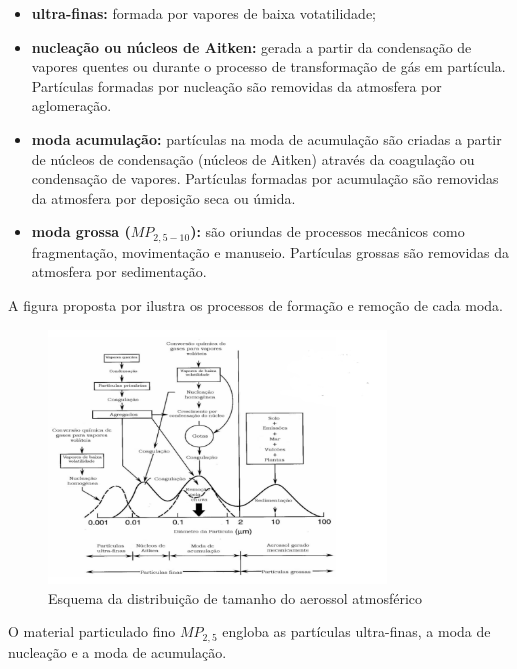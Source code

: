 \begin{itemize}
  \item \textbf{ultra-finas:} formada por vapores de baixa votatilidade;
  \item \textbf{nucleação ou núcleos de Aitken:} 
        gerada a partir da condensação de vapores quentes ou durante o processo de 
        transformação de gás em partícula. Partículas formadas por 
        nucleação são removidas da atmosfera por aglomeração.   
  \item \textbf{moda acumulação:} 
         partículas na moda de acumulação são criadas 
         a partir de núcleos de condensação (núcleos de Aitken) através da 
         coagulação ou condensação de vapores. 
         Partículas formadas por acumulação
         são removidas da atmosfera por deposição seca ou úmida.
  \item \textbf{moda grossa ($MP_{2,5-10}$):} 
        são oriundas de processos mecânicos como fragmentação, 
        movimentação e manuseio. Partículas grossas são removidas da atmosfera 
        por sedimentação.
\end{itemize}

A figura proposta por \citep{finlayson1999} ilustra os processos de 
formação e remoção de cada moda. 

\begin{figure}[H]
\begin{center}
  \includegraphics[width=0.8\textwidth]{../inputs/images/modas_aerossol.png}
  \caption{Esquema da distribuição de tamanho do aerossol atmosférico 
           \citep{finlayson1999} \label{fig:modas_aerossol}}
\end{center}
\end{figure}

O material particulado fino $MP_{2,5}$ engloba as partículas 
ultra-finas, a moda de nucleação e a moda de acumulação.  

